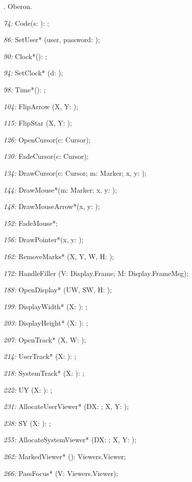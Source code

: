 . Oberon.

\item{\it 74:} Code(\VAR s: \ARRAYOF\CHAR): \LONGINT;
\item{\it 86:} SetUser* (\VAR user, password: \ARRAYOF\CHAR);
\item{\it 90:} Clock*(): \LONGINT;
\item{\it 94:} SetClock* (d: \LONGINT);
\item{\it 98:} Time*(): \LONGINT;
\item{\it 104:} FlipArrow (X, Y: \INTEGER);
\item{\it 115:} FlipStar (X, Y: \INTEGER);
\item{\it 126:} OpenCursor(\VAR c: Cursor);
\item{\it 130:} FadeCursor(\VAR c: Cursor);
\item{\it 134:} DrawCursor(\VAR c: Cursor; m: Marker; x, y: \INTEGER);
\item{\it 144:} DrawMouse*(m: Marker; x, y: \INTEGER);
\item{\it 148:} DrawMouseArrow*(x, y: \INTEGER);
\item{\it 152:} FadeMouse*;
\item{\it 156:} DrawPointer*(x, y: \INTEGER);
\item{\it 162:} RemoveMarks* (X, Y, W, H: \INTEGER);
\item{\it 172:} HandleFiller (V: Display.Frame; \VAR M: Display.FrameMsg);
\item{\it 188:} OpenDisplay* (UW, SW, H: \INTEGER);
\item{\it 199:} DisplayWidth* (X: \INTEGER): \INTEGER;
\item{\it 203:} DisplayHeight* (X: \INTEGER): \INTEGER;
\item{\it 207:} OpenTrack* (X, W: \INTEGER);
\item{\it 214:} UserTrack* (X: \INTEGER): \INTEGER;
\item{\it 218:} SystemTrack* (X: \INTEGER): \INTEGER;
\item{\it 222:} UY (X: \INTEGER): \INTEGER;
\item{\it 231:} AllocateUserViewer* (DX: \INTEGER; \VAR X, Y: \INTEGER);
\item{\it 238:} SY (X: \INTEGER): \INTEGER;
\item{\it 255:} AllocateSystemViewer* (DX: \INTEGER; \VAR X, Y: \INTEGER);
\item{\it 262:} MarkedViewer* (): Viewers.Viewer;
\item{\it 266:} PassFocus* (V: Viewers.Viewer);
